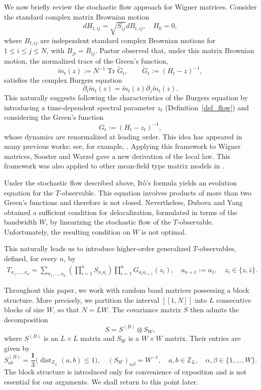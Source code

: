 \documentclass[10pt,reqno]{article}
\renewcommand{\bar}{\overline}
\DeclareMathOperator{\tr}{Tr}
\theoremstyle{plain} %
\theoremstyle{remark}
\numberwithin{equation}{section}
\begin{document}
We now briefly review the stochastic flow approach for Wigner matrices. Consider the standard complex matrix Brownian motion
\[
dH_{t,ij} = \sqrt{S_{ij}} dB_{t,ij}, \quad H_0 = 0,
\]
where \(B_{t,ij}\) are independent standard complex Brownian motions for \(1\le i\le j\le N\), with \(B_{ji}=\overline{B}_{ij}\). Pastur \cite{Pastur} observed that, under this matrix Brownian motion, the normalized trace of the Green's function,
\[
\tilde m_t(z):=N^{-1}\tr \tilde G_t,\qquad \tilde G_t:=(H_t-z)^{-1},
\]
satisfies the complex Burgers equation
\[
\partial_t \tilde m_t(z) = \tilde m_t(z) \partial_z \tilde m_t(z).
\]
This naturally suggests following the characteristics of the Burgers equation by introducing a time-dependent spectral parameter \(z_t\) (Definition~\ref{def_flow}) and considering the Green's function
\[
G_{t} := (H_{t} - z_t)^{-1},
\]
whose dynamics are renormalized at leading order. This idea has appeared in many previous works; see, for example,
\cite{DY,Lee_edge,AdhikariHuang2020DBMEdge,AdhikariLandon2023UnitaryBM,Bourgade2022ExtremeGaps,HuangLandon2019DBM,LandonLopattoSosoe2024SingleEigenvalue,LandonSosoe2022BulkCLT,stone2024randommatrixmodelquantum}. Applying this framework to Wigner matrices, Sooster and Warzel \cite{10.1214/19-ECP278,Sooster2019} gave a new derivation of the local law. This framework was also applied to other mean-field type matrix models in \cite{CipolloniErdosXu2023Extremal,CipolloniErdosSchroder2024MesoscopicNonHermitian, stone2024randommatrixmodelquantum}.


Under the stochastic flow described above, It\^o's formula yields an evolution equation for the \(T\)-observable. This equation involves products of more than two Green's functions and therefore is not closed. Nevertheless, Dubova and Yang \cite{DY} obtained a sufficient condition for delocalization, formulated in terms of the bandwidth \(W\), by linearizing the stochastic flow of the \(T\)-observable. Unfortunately, the resulting condition on \(W\) is not optimal.

This naturally leads us to introduce higher-order generalized \(T\)-observables, defined, for every \(n\), by
\begin{align}\label{gt}
T_{x_1, \dots, x_n} = \sum_{a_1, \dots, a_n} \left( \prod_{i=1}^n S_{x_i a_i} \right) \prod_{i=1}^n G_{a_i a_{i+1}}(z_i), \quad a_{n+1} := a_1, \quad z_i \in \{z, \bar{z}\}.
\end{align}


Throughout this paper, we work with random band matrices possessing a block structure. More precisely, we partition the interval \( [[1,N]] \) into \(L\) consecutive blocks of size \(W\), so that \(N=LW\). The covariance matrix \(S\) then admits the decomposition
\[
S = S^{(B)} \otimes S_W,
\]
where \(S^{(B)}\) is an \(L\times L\) matrix and \(S_W\) is a \(W\times W\) matrix. Their entries are given by
\[
S^{(B)}_{ab} = \frac{\mathbf{1}}{3}\bigl(\operatorname{dist}_{\mathbb{Z}_L}(a,b) \le 1\bigr), \quad (S_W)_{\alpha\beta} = W^{-1}, \quad a, b \in \mathbb{Z}_L, \quad \alpha,\beta \in \{1, \dots, W\}.
\]
The block structure is introduced only for convenience of exposition and is not essential for our arguments. We shall return to this point later.
\end{document}
